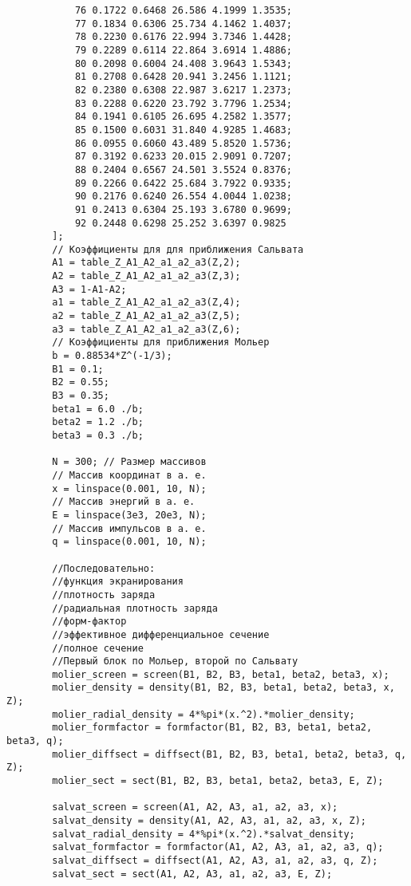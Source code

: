 \documentclass[a4paper,14pt]{extarticle} %
\begin{document}
\begin{verbatim}
	        76 0.1722 0.6468 26.586 4.1999 1.3535;
	        77 0.1834 0.6306 25.734 4.1462 1.4037;
	        78 0.2230 0.6176 22.994 3.7346 1.4428;
	        79 0.2289 0.6114 22.864 3.6914 1.4886;
	        80 0.2098 0.6004 24.408 3.9643 1.5343;
	        81 0.2708 0.6428 20.941 3.2456 1.1121;
	        82 0.2380 0.6308 22.987 3.6217 1.2373;
	        83 0.2288 0.6220 23.792 3.7796 1.2534;
	        84 0.1941 0.6105 26.695 4.2582 1.3577;
	        85 0.1500 0.6031 31.840 4.9285 1.4683;
	        86 0.0955 0.6060 43.489 5.8520 1.5736;
	        87 0.3192 0.6233 20.015 2.9091 0.7207;
	        88 0.2404 0.6567 24.501 3.5524 0.8376;
	        89 0.2266 0.6422 25.684 3.7922 0.9335;
	        90 0.2176 0.6240 26.554 4.0044 1.0238;
	        91 0.2413 0.6304 25.193 3.6780 0.9699;
	        92 0.2448 0.6298 25.252 3.6397 0.9825
	    ];
	    // Коэффициенты для для приближения Сальвата
	    A1 = table_Z_A1_A2_a1_a2_a3(Z,2);
	    A2 = table_Z_A1_A2_a1_a2_a3(Z,3);
	    A3 = 1-A1-A2;
	    a1 = table_Z_A1_A2_a1_a2_a3(Z,4);
	    a2 = table_Z_A1_A2_a1_a2_a3(Z,5);
	    a3 = table_Z_A1_A2_a1_a2_a3(Z,6);
	    // Коэффициенты для приближения Мольер
	    b = 0.88534*Z^(-1/3);
	    B1 = 0.1;
	    B2 = 0.55;
	    B3 = 0.35;
	    beta1 = 6.0 ./b;
	    beta2 = 1.2 ./b;
	    beta3 = 0.3 ./b;
	   
	    N = 300; // Размер массивов
	    // Массив координат в а. е.
	    x = linspace(0.001, 10, N);
	    // Массив энергий в а. е.
	    E = linspace(3e3, 20e3, N);
	    // Массив импульсов в а. е.
	    q = linspace(0.001, 10, N);
	    
	    //Последовательно:
	    //функция экранирования
	    //плотность заряда
	    //радиальная плотность заряда
	    //форм-фактор
	    //эффективное дифференциальное сечение
	    //полное сечение
	    //Первый блок по Мольер, второй по Сальвату
	    molier_screen = screen(B1, B2, B3, beta1, beta2, beta3, x);
	    molier_density = density(B1, B2, B3, beta1, beta2, beta3, x, Z);
	    molier_radial_density = 4*%pi*(x.^2).*molier_density;
	    molier_formfactor = formfactor(B1, B2, B3, beta1, beta2, beta3, q);
	    molier_diffsect = diffsect(B1, B2, B3, beta1, beta2, beta3, q, Z);
	    molier_sect = sect(B1, B2, B3, beta1, beta2, beta3, E, Z);
	    
	    salvat_screen = screen(A1, A2, A3, a1, a2, a3, x);
	    salvat_density = density(A1, A2, A3, a1, a2, a3, x, Z);
	    salvat_radial_density = 4*%pi*(x.^2).*salvat_density;
	    salvat_formfactor = formfactor(A1, A2, A3, a1, a2, a3, q);
	    salvat_diffsect = diffsect(A1, A2, A3, a1, a2, a3, q, Z);   
	    salvat_sect = sect(A1, A2, A3, a1, a2, a3, E, Z);
	    

\end{verbatim}
\end{document}
